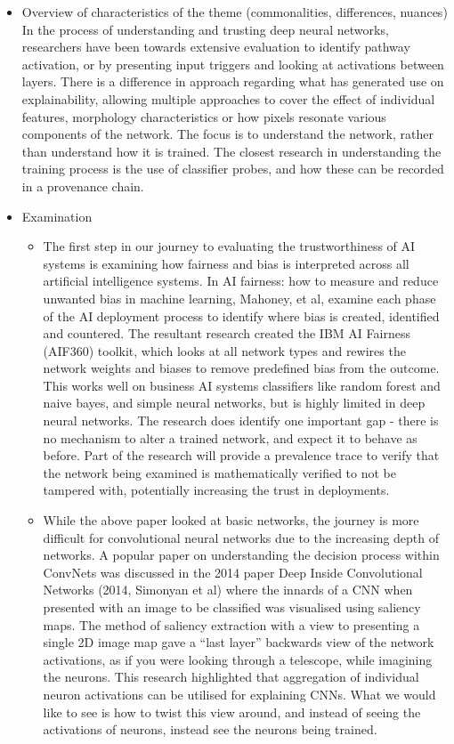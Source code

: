 \begin{itemize}
    \item Overview of characteristics of the theme (commonalities, differences, nuances)
    In the process of understanding and trusting deep neural networks, researchers have been towards extensive evaluation to identify pathway activation, or by presenting input triggers and looking at activations between layers. There is a difference in approach regarding what has generated use on explainability, allowing multiple approaches to cover the effect of individual features, morphology characteristics or how pixels resonate various components of the network. The focus is to understand the network, rather than understand how it is trained. The closest research in understanding the training process is the use of classifier probes, and how these can be recorded in a provenance chain.
    
    \item Examination
    \begin{itemize}
        \item The first step in our journey to evaluating the trustworthiness of AI systems is examining how fairness and bias is interpreted across all artificial intelligence systems. In AI fairness: how to measure and reduce unwanted bias in machine learning, Mahoney, et al, examine each phase of the AI deployment process to identify where bias is created, identified and countered. The resultant research created the IBM AI Fairness (AIF360) toolkit, which looks at all network types and rewires the network weights and biases to remove predefined bias from the outcome. This works well on business AI systems classifiers like random forest and naive bayes, and simple neural networks, but is highly limited in deep neural networks. The research does identify one important gap - there is no mechanism to alter a trained network, and expect it to behave as before. Part of the research will provide a prevalence trace to verify that the network being examined is mathematically verified to not be tampered with, potentially increasing the trust in deployments.
  
        \item While the above paper looked at basic networks, the journey is more difficult for convolutional neural networks due to the increasing depth of networks. A popular paper on understanding the decision process within ConvNets was discussed in the 2014 paper Deep Inside Convolutional Networks (2014, Simonyan et al) where the innards of a CNN when presented with an image to be classified was visualised using saliency maps. The method of saliency extraction with a view to presenting a single 2D image map gave a “last layer” backwards view of the network activations, as if you were looking through a telescope, while imagining the neurons. This research highlighted that aggregation of individual neuron activations can be utilised for explaining CNNs. What we would like to see is how to twist this view around, and instead of seeing the activations of neurons, instead see the neurons being trained.
  

\end{itemize}
\end{itemize}
